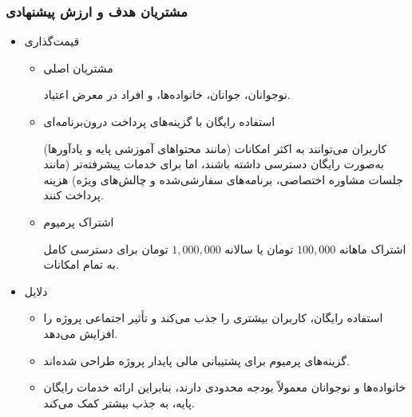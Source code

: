 \documentclass[dvipsnames, svgnames, x11names, 11pt]{article}
\begin{document}
\subsubsection{مشتریان هدف و ارزش پیشنهادی}
\begin{itemize}
\item 
قیمت‌گذاری
\begin{itemize}
\item
مشتریان اصلی

نوجوانان، جوانان، خانواده‌ها، و افراد در معرض اعتیاد.

\item
استفاده رایگان با گزینه‌های پرداخت درون‌برنامه‌ای

کاربران می‌توانند به اکثر امکانات (مانند محتواهای آموزشی پایه و یادآورها) به‌صورت رایگان دسترسی داشته باشند، اما برای خدمات پیشرفته‌تر (مانند جلسات مشاوره اختصاصی، برنامه‌های سفارشی‌شده و چالش‌های ویژه) هزینه پرداخت کنند.

\item
اشتراک پرمیوم

اشتراک ماهانه
$100,000$
تومان یا سالانه
$1,000,000$
تومان برای دسترسی کامل به تمام امکانات.
\end{itemize}

\item 
دلایل
\begin{itemize}
\item
استفاده رایگان، کاربران بیشتری را جذب می‌کند و تأثیر اجتماعی پروژه را افزایش می‌دهد.

\item
گزینه‌های پرمیوم برای پشتیبانی مالی پایدار پروژه طراحی شده‌اند.

\item
خانواده‌ها و نوجوانان معمولاً بودجه محدودی دارند، بنابراین ارائه خدمات رایگان پایه، به جذب بیشتر کمک می‌کند.
\end{itemize}
\end{itemize}
\end{document}
